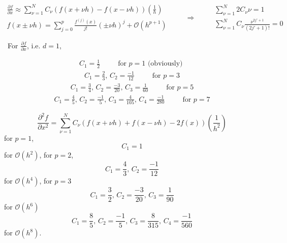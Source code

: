 \documentclass[10pt, landscape]{amsart}
\begin{document}
\pagebreak
{
\LARGE 
\[
\begin{gathered}
\frac{ \partial f}{ \partial x} \approx \sum_{\nu = 1}^N C_{\nu}(f(x+\nu h) - f(x-\nu h)) \left( \frac{1}{h} \right) \\
f(x\pm \nu h) = \sum_{j=0}^p \frac{ f^{(j)}(x) }{ j!} (\pm \nu h)^j + \mathcal{O}(h^{p+1})
\end{gathered} \qquad \, \Longrightarrow \qquad \, \begin{gathered}
  \sum_{\nu = 1}^N 2C_{\nu} \nu  = 1 \\ 
 \sum_{\nu = 1}^N C_{\nu} \frac{ \nu^{2j' + 1 } }{ (2j'+1)! } =0
  \end{gathered}
\]

\qquad \qquad \, For $\frac{ \partial f}{ \partial x }$, i.e. $d=1$,

\[
\begin{gathered}
  C_1 = \frac{1}{2} \qquad \, \text{ for } p = 1  \text{ (obviously) }
\end{gathered}
\]
\[
\begin{gathered}
  C_1 = \frac{2}{3}, \, C_2 = \frac{-1}{12} \qquad \, \text{ for } p = 3  
\end{gathered}
\]
\[
\begin{gathered}
  C_1 = \frac{3}{4}, \, C_2 = \frac{-3}{20}, \, C_3 = \frac{1}{60} \qquad \, \text{ for } p = 5  
\end{gathered}
\]
\[
\begin{gathered}
  C_1 = \frac{4}{5}, \, C_2 = \frac{-1}{5}, \, C_3 = \frac{4}{105}, \, C_4 = \frac{-1}{280} \qquad \, \text{ for } p = 7  
\end{gathered}
\]


}
 
\pagebreak

{\LARGE
\[
\frac{ \partial^2 f}{ \partial x^2} = \sum_{\nu = 1}^N C_{\nu} (f(x+\nu h) + f(x-\nu h) - 2f(x)) \left( \frac{1}{h^2} \right)
\]
for $p=1$,
\[
C_{1} = 1
\]
for $\mathcal{O}(h^2)$, for $p=2$,
\[
C_1 = \frac{4}{3}, \, C_2 = \frac{-1}{12}
\]
for $\mathcal{O}(h^4)$, for $p=3$
\[
C_1 = \frac{3}{2}, \, C_2 = \frac{-3}{20}, \, C_3 = \frac{1}{90}
\]
for $\mathcal{O}(h^6)$
\[
C_1 = \frac{8}{5}, \, C_2 = \frac{-1}{5}, \, C_3 = \frac{8}{315}, \, C_4 = \frac{-1}{560}
\]
for $\mathcal{O}(h^8)$.  
}

\pagebreak
\end{document}
